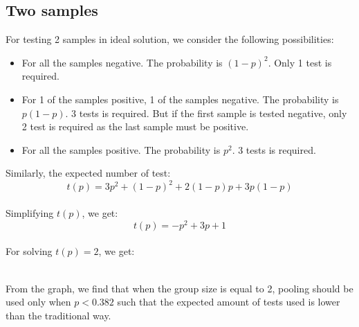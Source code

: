 \subsection{Two samples}
For testing 2 samples in ideal solution, we consider the following possibilities:

\begin{itemize}
  \item For all the samples negative. The probability is $(1-p)^2$. Only 1 test is required.
  \item For 1 of the samples positive, 1 of the samples negative. The probability is $p(1-p)$. 3 tests is required. But if the first sample is tested negative, only 2 test is required as the last sample must be positive.
  \item For all the samples positive. The probability is $p^2$. 3 tests is required.
\end{itemize}
Similarly, the expected number of test:
\\
\begin{displaymath}
t(p)=3p^2+(1-p)^2+2(1-p)p+3p(1-p)
\end{displaymath}
\\
Simplifying $t(p)$, we get:
\\
\begin{displaymath}
t(p)=-p^2+3p+1
\end{displaymath}
\\
For solving $t(p)=2$, we get:
\\
\begin{center}
\end{center}
\\
From the graph, we find that when the group size is equal to 2, pooling should be used only when $p<0.382$ such that the expected amount of tests used is lower than the traditional way.
